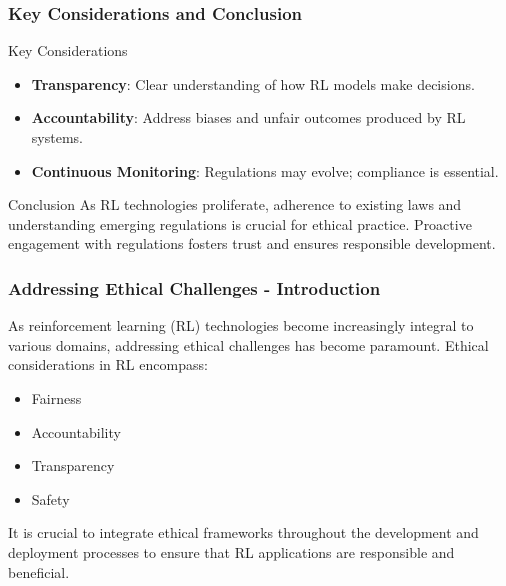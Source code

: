 \documentclass{beamer}
\begin{document}
\begin{frame}[fragile]
    \frametitle{Key Considerations and Conclusion}
    \begin{block}{Key Considerations}
        \begin{itemize}
            \item \textbf{Transparency}: Clear understanding of how RL models make decisions.
            \item \textbf{Accountability}: Address biases and unfair outcomes produced by RL systems.
            \item \textbf{Continuous Monitoring}: Regulations may evolve; compliance is essential.
        \end{itemize}
    \end{block}

    \begin{block}{Conclusion}
        As RL technologies proliferate, adherence to existing laws and understanding emerging regulations is crucial for ethical practice.
        Proactive engagement with regulations fosters trust and ensures responsible development.
    \end{block}
\end{frame}

\begin{frame}[fragile]
    \frametitle{Addressing Ethical Challenges - Introduction}
    As reinforcement learning (RL) technologies become increasingly integral to various domains, addressing ethical challenges has become paramount. Ethical considerations in RL encompass:
    \begin{itemize}
        \item Fairness
        \item Accountability
        \item Transparency
        \item Safety
    \end{itemize}
    It is crucial to integrate ethical frameworks throughout the development and deployment processes to ensure that RL applications are responsible and beneficial.
\end{frame}
\end{document}

